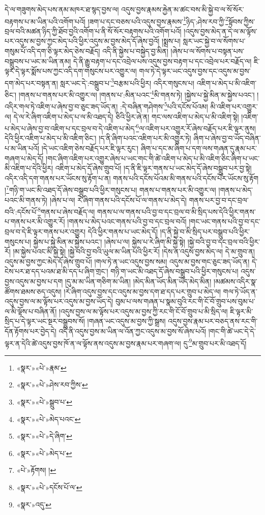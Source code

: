 དེ་ལ་གཟུགས་མེད་པས་ནམ་མཁར་ཐ་སྙད་བྱས་ལ། འདུས་བྱས་རྣམས་རྐྱེན་མ་ཚང་བས་མི་སྐྱེ་བ་ལ་སོ་སོར་བརྟགས་པ་མ་ཡིན་པའི་འགོག་པའོ། །ཟག་པ་དང་བཅས་པའི་འདུས་བྱས་རྣམས་\footnote{«སྣར་»«པེ་»རྣམ་}ཉིད་:ཤེས་རབ་ཀྱི་\footnote{«སྣར་»«པེ་»ཤེས་རབ་ཀྱིས་}སྟོབས་ཀྱིས་བྲལ་བའི་མཚན་ཉིད་ཀྱི་ཐོབ་བྱའི་འགོག་པ་ནི་སོ་སོར་བརྟགས་པའི་འགོག་པའོ། །འདུས་བྱས་མེད་ན་དེ་ལ་མ་ལྟོས་པར་འདུས་མ་བྱས་ཀྱང་མེད་པའི་ཕྱིར་འདུས་མ་བྱས་མེད་དོ་ཞེས་བྱའོ། །སྨྲས་པ། སླར་ཡང་སྐྱེ་བ་ལ་སོགས་པ་གསུམ་པོ་འདི་དག་ཅི་ལྟར་མེད་ཅེས་བརྗོད། འདི་ནི་སྐྱེས་པ་བསྐྱེད་བྱ་མིན། །ཞེས་པ་ལ་སོགས་པ་བསྟན་པས་བསྒྲུབས་པ་ཡང་མ་ཡིན་ནམ། དེ་ནི་རྒྱུ་བརྟག་པ་དང་འབྲེལ་པས་འདུས་བྱས་བརྟག་པ་དང་འབྲེལ་པར་བརྗོད་ལ། ཇི་ལྟར་དེ་ལྟར་སྨོས་པས་ཀྱང་འདི་དག་གསུངས་པར་འགྱུར་ལ། གལ་ཏེ་དེ་ལྟར་ཡང་འདུས་བྱས་དང་འདུས་མ་བྱས་དག་མེད་པར་བསྟན་ན། སླར་ཡང་དེ་:བསྒྲུབ་པ་\footnote{«སྣར་»«པེ་»སྒྲུབ་པ་}བརྩམ་པའི་ཕྱིར། འདིར་གསུངས་པ། འཇིག་པ་མེད་པ་མི་འཇིག་ཅིང་། །གནས་པ་གནས་པར་མི་འགྱུར་ལ། །གནས་པ་:མིན་པའང་\footnote{«སྣར་»«པེ་»མེད་པའང་}མི་གནས་ཏེ། །སྐྱེས་པ་སྐྱེ་མིན་མ་སྐྱེས་པའང་། །འདིར་གལ་ཏེ་འཇིག་པ་ཞེས་བྱ་བ་ཅུང་ཟད་ཡོད་ན། :དེ་བཞིན་གཤེགས་\footnote{«སྣར་»«པེ་»དེ་ཞིག་}པའི་དངོས་པོའམ། མི་འཇིག་པར་འགྱུར་ལ། དེ་ལ་རེ་ཞིག་འཇིག་པ་མེད་པ་ལ་མི་འཐད་དེ། ཅིའི་ཕྱིར་ཞེ་ན། གང་ལས་འཇིག་པ་མེད་པ་མི་འཇིག་སྟེ། །འཇིག་པ་མེད་པ་ཞེས་བྱ་བ་འཇིག་པ་དང་བྲལ་བ་དེ་འཇིག་པ་མེད་\footnote{«སྣར་»«པེ་»མེད་པ་}ལ་འཇིག་པར་འགྱུར་རོ་ཞེས་བརྗོད་པར་ཇི་ལྟར་ནུས། དེའི་ཕྱིར་འཇིག་པ་མེད་པ་མི་འཇིག་ཅིང་། །ད་ནི་ཞིག་པའང་འཇིག་པར་མི་འགྱུར་ཏེ། ཞིག་པ་ཞེས་བྱ་བ་ཡོད་བཞིན་པ་མ་ཡིན་པའོ། །དེ་ཡང་འཇིག་ཅེས་བརྗོད་པར་ཇི་ལྟར་རུང་། ཞིག་པ་དང་མ་ཞིག་པ་དག་ལས་གཞན་དུ་རྣམ་པར་གཞག་པ་མེད་དོ། །གང་ཞིག་འཇིག་པར་འགྱུར་ཞེས་པ་ཡང་གང་གི་ཚེ་འཇིག་པ་མེད་པ་མི་འཇིག་ཅིང་ཞིག་པ་ཡང་མི་འཇིག་པ་དེའི་ཕྱིར། འཇིག་པ་མེད་དོ་ཞེས་གྲུབ་པོ། །ད་ནི་ཇི་ལྟར་གནས་པ་ཡང་མེད་དོ་ཞེས་བསྒྲུབ་པར་བྱ་སྟེ། འདིར་འདི་དག་གནས་པར་ཡོངས་སུ་རྟོག་པ་ན། གནས་པའི་དངོས་པོའམ་མི་གནས་པའི་དངོས་པོར་ཡོངས་སུ་རྟོག །\footnote{«པེ་»རྟོགས། །}གཉི་ག་ཡང་མི་འཐད་དོ་ཞེས་བསྒྲུབ་པའི་ཕྱིར་གསུངས་པ། གནས་པ་གནས་པར་མི་འགྱུར་ལ། །གནས་པ་མེད་པའང་མི་གནས་ཏེ། །ཞེས་པ་ལ། རེ་ཞིག་གནས་པའི་དངོས་པོ་ལ་གནས་པ་མེད་དེ། གནས་པར་བྱ་བ་དང་བྲལ་བའི་:དངོས་པོ་\footnote{«སྣར་»«པེ་»དངོས་པོ་ལ་}གནས་པ་ཞེས་བརྗོད་ལ། གནས་པ་ལ་གནས་པའི་བྱ་བ་དང་བྲལ་བ་མི་སྲིད་པས་དེའི་ཕྱིར་གནས་པ་གནས་པར་མི་འགྱུར་རོ། །གནས་པ་མེད་པའང་གནས་པའི་བྱ་བ་དང་བྲལ་བའོ། །གང་ཡང་གནས་པའི་བྱ་བ་དང་བྲལ་བ་དེ་ཇི་ལྟར་གནས་པར་འགྱུར། དེའི་ཕྱིར་གནས་པ་ཡང་མེད་དོ། །ད་ནི་སྐྱེ་བ་མི་སྲིད་པར་བསྒྲུབ་པའི་ཕྱིར་གསུངས་པ། སྐྱེས་པ་སྐྱེ་མིན་མ་སྐྱེས་པའང་། །ཞེས་པ་ལ། སྐྱེས་པ་རེ་ཞིག་མི་སྐྱེ་སྟེ། །སྐྱེ་བའི་བྱ་བ་དང་བྲལ་བའི་ཕྱིར་རོ། །མ་སྐྱེས་པའང་མི་སྐྱེ་སྟེ། །སྐྱེ་བའི་བྱ་བའི་ཡུལ་མ་ཡིན་པའི་ཕྱིར་རོ། །དེས་ན་འདུས་བྱས་མེད་ལ། དེ་མ་གྲུབ་ན། འདུས་མ་བྱས་ཀྱང་མེད་དོ་ཞེས་གྲུབ་པོ། །གལ་ཏེ་ན་ཡང་འདུས་བྱས་སམ། འདུས་མ་བྱས་གང་ཅུང་ཟད་ཡོད་ན། དེ་ངེས་པར་ཐ་དད་པའམ་ཐ་མི་དད་པ་ཞིག་གྲང་། གཉི་ག་ཡང་མི་འཐད་དོ་ཞེས་བསྒྲུབ་པའི་ཕྱིར་གསུངས་པ། འདུས་བྱས་འདུས་མ་བྱས་པ་དག །དུ་མ་མ་ཡིན་གཅིག་མ་ཡིན། །མེད་མིན་ཡོད་མིན་ཡོད་མེད་མིན། །མཚམས་འདིར་སྣ་ཚོགས་ཐམས་ཅད་འདུས། །རེ་ཞིག་འདུས་བྱས་དང་འདུས་མ་བྱས་དག་ཐ་དད་པར་གྲུབ་པ་མེད་ལ། གལ་ཏེ་ཡོད་ན་འདུས་བྱས་ལ་མ་ལྟོས་པར་འདུས་མ་བྱས་ཡོད་དེ། བུམ་པ་ལས་གཞན་པ་སྣམ་བུའི་རང་གི་ངོ་བོ་གྲུབ་པས་བུམ་པ་ལ་མི་ལྟོས་པ་བཞིན་ནོ། །འདུས་བྱས་ལ་མ་ལྟོས་པར་འདུས་མ་བྱས་ཀྱི་རང་གི་ངོ་བོ་གྲུབ་པ་མི་སྲིད་ལ། ཇི་ལྟར་མི་སྲིད་པ་དེ་ལྟར་ཡང་སྔར་བསྒྲུབས་སོ། །གཞན་ཡང་འདུས་མ་བྱས་ཀྱི་སྒྲས། འདུས་བྱས་རྣམ་པར་བཅད་ནས་རང་གི་དོན་རྟོགས་པར་བྱེད་དེ། འདི་ནི་འདུས་བྱས་མ་ཡིན་ལ་འོན་ཀྱང་འདུས་མ་བྱས་སོ་ཞེས་པའོ། །གང་གི་ཚེ་ཡང་དེ་དེ་ལྟར་ན་དེའི་ཚེ་འདུས་བྱས་ཁོ་ན་ལ་ལྟོས་ནས་འདུས་མ་བྱས་རྣམ་པར་གཞག་ལ། དུ་\footnote{«སྣར་»འདུ་}མ་གྲུབ་པར་མི་འཐད་དོ། 